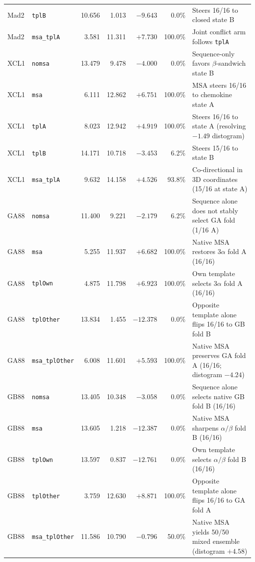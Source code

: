 \documentclass[10pt,a4paper]{article}
\begin{document}
\begin{table}[!ht]
\begin{tabularx}{\textwidth}{l l r r r r Y}
Mad2 & \texttt{tplB} & 10.656 & 1.013 & $-9.643$ & 0.0\% & Steers 16/16 to closed state B \\
Mad2 & \texttt{msa\_tplA} & 3.581 & 11.311 & $+7.730$ & 100.0\% & Joint conflict arm follows \texttt{tplA} \\
\midrule
XCL1 & \texttt{nomsa} & 13.479 & 9.478 & $-4.000$ & 0.0\% & Sequence-only favors $\beta$-sandwich state B \\
XCL1 & \texttt{msa} & 6.111 & 12.862 & $+6.751$ & 100.0\% & MSA steers 16/16 to chemokine state A \\
XCL1 & \texttt{tplA} & 8.023 & 12.942 & $+4.919$ & 100.0\% & Steers 16/16 to state A (resolving $-1.49$ distogram) \\
XCL1 & \texttt{tplB} & 14.171 & 10.718 & $-3.453$ & 6.2\% & Steers 15/16 to state B \\
XCL1 & \texttt{msa\_tplA} & 9.632 & 14.158 & $+4.526$ & 93.8\% & Co-directional in 3D coordinates (15/16 at state A) \\
\midrule
GA88 & \texttt{nomsa} & 11.400 & 9.221 & $-2.179$ & 6.2\% & Sequence alone does not stably select GA fold (1/16 A) \\
GA88 & \texttt{msa} & 5.255 & 11.937 & $+6.682$ & 100.0\% & Native MSA restores $3\alpha$ fold A (16/16) \\
GA88 & \texttt{tplOwn} & 4.875 & 11.798 & $+6.923$ & 100.0\% & Own template selects $3\alpha$ fold A (16/16) \\
GA88 & \texttt{tplOther} & 13.834 & 1.455 & $-12.378$ & 0.0\% & Opposite template alone flips 16/16 to GB fold B \\
GA88 & \texttt{msa\_tplOther} & 6.008 & 11.601 & $+5.593$ & 100.0\% & Native MSA preserves GA fold A (16/16; distogram $-4.24$) \\
\midrule
GB88 & \texttt{nomsa} & 13.405 & 10.348 & $-3.058$ & 0.0\% & Sequence alone selects native GB fold B (16/16) \\
GB88 & \texttt{msa} & 13.605 & 1.218 & $-12.387$ & 0.0\% & Native MSA sharpens $\alpha/\beta$ fold B (16/16) \\
GB88 & \texttt{tplOwn} & 13.597 & 0.837 & $-12.761$ & 0.0\% & Own template selects $\alpha/\beta$ fold B (16/16) \\
GB88 & \texttt{tplOther} & 3.759 & 12.630 & $+8.871$ & 100.0\% & Opposite template alone flips 16/16 to GA fold A \\
GB88 & \texttt{msa\_tplOther} & 11.586 & 10.790 & $-0.796$ & 50.0\% & Native MSA yields 50/50 mixed ensemble (distogram $+4.58$) \\
\bottomrule
\end{tabularx}
\end{table}
\end{document}
